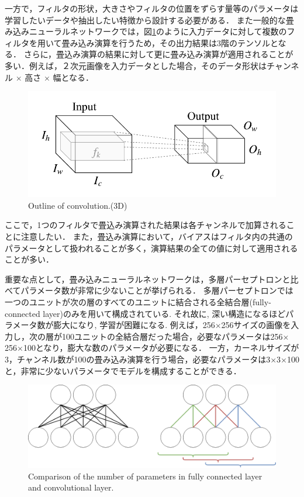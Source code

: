     一方で，フィルタの形状，大きさやフィルタの位置をずらす量等のパラメータは学習したいデータや抽出したい特徴から設計する必要がある．
    また一般的な畳み込みニューラルネットワークでは，図\ref{fig:outline_of_convolution_3d}のように入力データに対して複数のフィルタを用いて畳み込み演算を行うため，その出力結果は3階のテンソルとなる．
    さらに，畳込み演算の結果に対して更に畳み込み演算が適用されることが多い．例えば，２次元画像を入力データとした場合，そのデータ形状はチャンネル $\times$ 高さ $\times$ 幅となる．
    \begin{figure}[ht]
      \centering
      \includegraphics[width=14cm]{8_appendix/img/outline_of_convolution_3d.pdf}
      \caption{Outline of convolution.(3D)}
      \label{fig:outline_of_convolution_3d}
    \end{figure}

    ここで，1つのフィルタで畳込み演算された結果は各チャンネルで加算されることに注意したい．
    また，畳込み演算において，バイアスはフィルタ内の共通のパラメータとして扱われることが多く，演算結果の全ての値に対して適用されることが多い．
    
    重要な点として，畳み込みニューラルネットワークは，多層パーセプトロンと比べてパラメータ数が非常に少ないことが挙げられる．
    多層パーセプトロンでは一つのユニットが次の層のすべてのユニットに結合される全結合層(fully-connected layer)のみを用いて構成されている.
    それ故に, 深い構造になるほどパラメータ数が膨大になり, 学習が困難になる.
    例えば，256$\times$256サイズの画像を入力し，次の層が100ユニットの全結合層だった場合，必要なパラメータは256$\times$256$\times$100となり，膨大な数のパラメータが必要になる．
    一方，カーネルサイズが3，チャンネル数が100の畳み込み演算を行う場合，必要なパラメータは3$\times$3$\times$100と，非常に少ないパラメータでモデルを構成することができる．
    
    \begin{figure}[ht]
        \begin{center}
            \includegraphics[width=12.0cm]{./8_appendix/img/FCL_conv.png}
            \caption{Comparison of the number of parameters in fully connected layer and convolutional layer.}
            \label{FCL_conv}
        \end{center}
    \end{figure}
    
